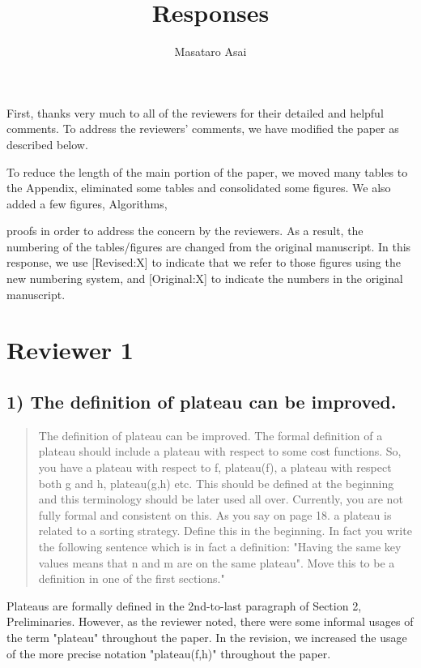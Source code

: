 \documentclass{article}
\author{Masataro Asai}
\date{}
\title{Responses}
\begin{document}
\maketitle
First, thanks very much to all of the reviewers for their detailed and helpful comments.
To address the reviewers' comments, we have modified the paper as described below.

To reduce the length of the main portion of the paper, we moved many tables to the Appendix, 
eliminated some tables and consolidated some figures. We also added a few figures, Algorithms,

proofs in order to address the concern by the reviewers.
As a result, the numbering of the tables/figures are changed from the original manuscript.
In this response, we use [Revised:X] to indicate that we refer to those figures using
the new numbering system, and [Original:X] to indicate the numbers in the original manuscript.

\section{Reviewer 1}
\label{sec:orgheadline13}

\subsection{1) The definition of plateau can be improved.}
\label{sec:orgheadline1}

\begin{quote}
The definition of plateau can be improved. The formal definition of
a plateau should include a plateau with respect to some cost
functions. So, you have a plateau with respect to f, plateau(f), a
plateau with respect both g and h, plateau(g,h) etc. This should be
defined at the beginning and this terminology should be later used all
over. Currently, you are not fully formal and consistent on this. As
you say on page 18. a plateau is related to a sorting strategy. Define
this in the beginning. In fact you write the following sentence which
is in fact a definition: "Having the same key values means that n and
m are on the same plateau". Move this to be a definition in one of the
first sections."
\end{quote}

Plateaus are formally defined in the 2nd-to-last paragraph of Section 2, Preliminaries.
However, as the reviewer noted, there were some informal usages of the term "plateau" throughout the paper.
In the revision, we increased the usage of the more precise notation "plateau(f,h)" throughout the paper.
\end{document}
